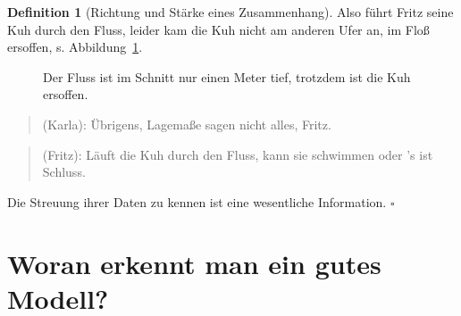 \documentclass[
  a4paper,
  DIV=11]{scrreprt}
\theoremstyle{definition}
\theoremstyle{definition}
\theoremstyle{definition}
\newtheorem{definition}{Definition}[chapter]
\theoremstyle{remark}
\begin{document}
\begin{definition}[Richtung und Stärke eines
Zusammenhang]
Also führt Fritz seine Kuh durch den Fluss, leider kam die Kuh nicht am
anderen Ufer an, im Floß ersoffen, s. Abbildung~\ref{fig-fluss-tief}.

\begin{figure}


\caption{\label{fig-fluss-tief}Der Fluss ist im Schnitt nur einen Meter
tief, trotzdem ist die Kuh ersoffen.}

\end{figure}%

\begin{quote}
{} (Karla): Übrigens, Lagemaße sagen nicht alles,
Fritz.
\end{quote}

\begin{quote}
{} (Fritz): Läuft die Kuh durch den Fluss, kann sie
schwimmen oder 's ist Schluss.
\end{quote}

\begin{tcolorbox}[enhanced jigsaw, leftrule=.75mm, opacitybacktitle=0.6, colback=white, colframe=quarto-callout-important-color-frame, coltitle=black, colbacktitle=quarto-callout-important-color!10!white, opacityback=0, left=2mm, breakable, titlerule=0mm, toptitle=1mm, bottomtitle=1mm, rightrule=.15mm, title=\textcolor{quarto-callout-important-color}{\faExclamation}\hspace{0.5em}{Wichtig}, arc=.35mm, bottomrule=.15mm, toprule=.15mm]

Die Streuung ihrer Daten zu kennen ist eine wesentliche Information.
\(\square\)

\end{tcolorbox}

\section{Woran erkennt man ein gutes
Modell?}\label{woran-erkennt-man-ein-gutes-modell}


\end{definition}
\end{document}

